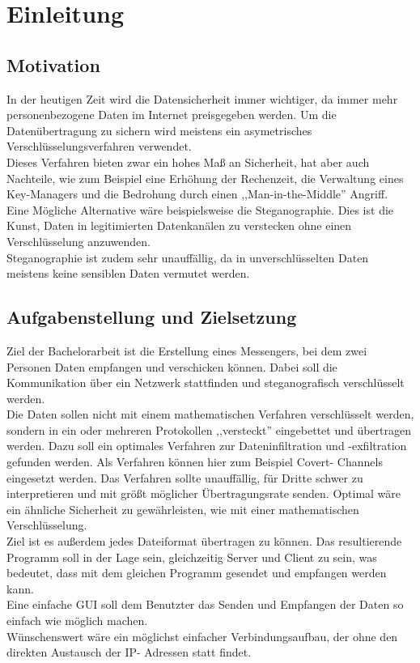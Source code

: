 

\chapter{Einleitung}
\label{cha:einleitung}


\section {Motivation}

In der heutigen Zeit wird die Datensicherheit immer wichtiger, da immer mehr personenbezogene Daten im Internet preisgegeben werden. Um die Daten\"ubertragung zu sichern wird meistens ein asymetrisches Verschl\"usselungsverfahren verwendet.\\
Dieses Verfahren bieten zwar ein hohes Ma{\ss} an Sicherheit, hat aber auch Nachteile, wie zum Beispiel eine Erh\"ohung der Rechenzeit, die Verwaltung eines Key-Managers und die Bedrohung durch einen ,,Man-in-the-Middle'' Angriff.\\ 
Eine M\"ogliche Alternative w\"are beispielsweise die Steganographie. Dies ist die Kunst, Daten in legitimierten Datenkan\"alen zu verstecken ohne einen Verschl\"usselung anzuwenden.\\
Steganographie ist zudem sehr unauff\"allig, da in unverschl\"usselten Daten meistens keine sensiblen Daten vermutet werden.

\section {Aufgabenstellung und Zielsetzung}

Ziel der Bachelorarbeit ist die Erstellung eines Messengers, bei dem zwei Personen Daten empfangen und verschicken k\"onnen. Dabei soll die Kommunikation \"uber ein Netzwerk stattfinden und steganografisch verschl\"usselt werden.\\ Die Daten sollen nicht mit einem mathematischen Verfahren verschl\"usselt werden, sondern in ein oder mehreren Protokollen ,,versteckt'' eingebettet und \"ubertragen werden. Dazu soll ein optimales Verfahren zur Dateninfiltration und -exfiltration gefunden werden. Als Verfahren k\"onnen hier zum Beispiel Covert- Channels eingesetzt werden. Das Verfahren sollte unauff\"allig, f\"ur Dritte schwer zu interpretieren und mit gr\"o{\ss}t m\"oglicher \"Ubertragungsrate senden. Optimal w\"are ein \"ahnliche Sicherheit zu gew\"ahrleisten, wie mit einer mathematischen Verschl\"usselung.\\
Ziel ist es au{\ss}erdem jedes Dateiformat \"ubertragen zu k\"onnen. Das resultierende Programm soll in der Lage sein, gleichzeitig Server und Client zu sein, was bedeutet, dass mit dem gleichen Programm gesendet und empfangen werden kann.\\
Eine einfache GUI soll dem Benutzter das Senden und Empfangen der Daten so einfach wie m\"oglich machen.\\
W\"unschenswert w\"are ein m\"oglichst einfacher Verbindungsaufbau, der ohne den direkten Austausch der IP- Adressen statt findet.\\


